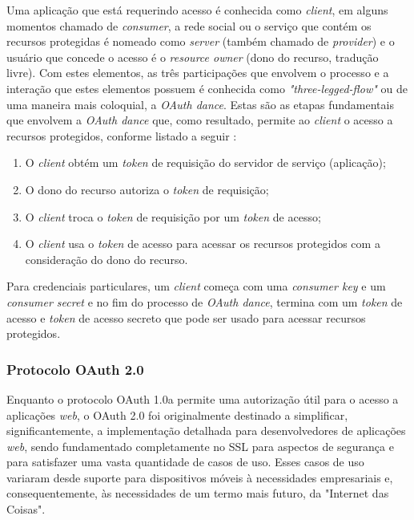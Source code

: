 Uma aplicação que está requerindo acesso é conhecida como \textit{client}, em alguns momentos chamado de \textit{consumer}, a rede social ou o serviço que contém os recursos protegidas é nomeado como \textit{server} (também chamado de \textit{provider}) e o usuário que concede o acesso é o \textit{resource owner} (dono do recurso, tradução livre). Com estes elementos, as três participações que envolvem o processo e a interação que estes elementos possuem é conhecida como \textit{"three-legged-flow"} ou de uma maneira mais coloquial, a \textit{OAuth dance}. Estas são as etapas fundamentais que envolvem a \textit{OAuth dance} que, como resultado, permite ao \textit{client} o acesso a recursos protegidos, conforme listado a seguir \cite{mining-social-web}:

\begin{enumerate}
	\item O \textit{client} obtém um \textit{token} de requisição do servidor de serviço (aplicação);
	\item O dono do recurso autoriza o \textit{token} de requisição;
	\item O \textit{client} troca o \textit{token} de requisição por um \textit{token} de acesso;
	\item O \textit{client} usa o \textit{token} de acesso para acessar os recursos protegidos com a consideração do dono do recurso.
\end{enumerate}

Para credenciais particulares, um \textit{client} começa com uma \textit{consumer key} e um \textit{consumer secret} e no fim do processo de \textit{OAuth dance}, termina com um \textit{token} de acesso e \textit{token} de acesso secreto que pode ser usado para acessar recursos protegidos.

\subsubsection{Protocolo OAuth 2.0}
Enquanto o protocolo OAuth 1.0a permite uma autorização útil para o acesso a aplicações \textit{web}, o OAuth 2.0 foi originalmente destinado a simplificar, significantemente, a implementação detalhada para desenvolvedores de aplicações \textit{web}, sendo fundamentado completamente no SSL para aspectos de segurança e para satisfazer uma vasta quantidade de casos de uso. Esses casos de uso variaram desde suporte para dispositivos móveis à necessidades empresariais e, consequentemente, às necessidades de um termo mais futuro, da "Internet das Coisas"\space \cite{mining-social-web}.

